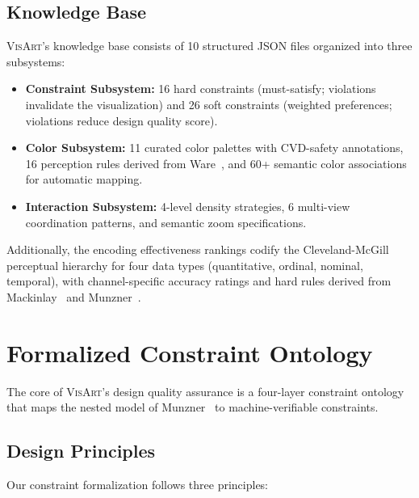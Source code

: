 \documentclass[journal]{vgtc}
\newcommand{\sysname}{\textsc{VisArt}}
\begin{document}
\subsection{Knowledge Base}

\sysname{}'s knowledge base consists of 10 structured JSON files organized into three subsystems:

\begin{itemize}
\item \textbf{Constraint Subsystem:} 16 hard constraints (must-satisfy; violations invalidate the visualization) and 26 soft constraints (weighted preferences; violations reduce design quality score).
\item \textbf{Color Subsystem:} 11 curated color palettes with CVD-safety annotations, 16 perception rules derived from Ware~\cite{ware2004information}, and 60+ semantic color associations for automatic mapping.
\item \textbf{Interaction Subsystem:} 4-level density strategies, 6 multi-view coordination patterns, and semantic zoom specifications.
\end{itemize}

Additionally, the encoding effectiveness rankings codify the Cleveland-McGill perceptual hierarchy for four data types (quantitative, ordinal, nominal, temporal), with channel-specific accuracy ratings and hard rules derived from Mackinlay~\cite{mackinlay1986automating} and Munzner~\cite{munzner2014visualization}.

\section{Formalized Constraint Ontology}

The core of \sysname{}'s design quality assurance is a four-layer constraint ontology that maps the nested model of Munzner~\cite{munzner2014visualization} to machine-verifiable constraints.

\subsection{Design Principles}

Our constraint formalization follows three principles:
\end{document}

